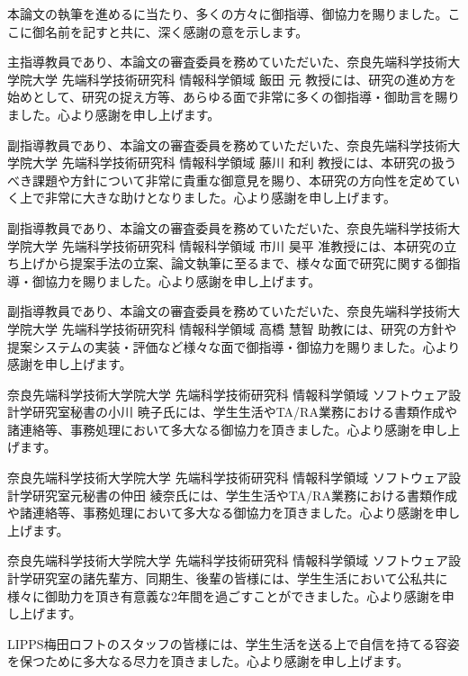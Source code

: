 本論文の執筆を進めるに当たり、多くの方々に御指導、御協力を賜りました。ここに御名前を記すと共に、深く感謝の意を示します。

主指導教員であり、本論文の審査委員を務めていただいた、奈良先端科学技術大学院大学 先端科学技術研究科 情報科学領域 飯田 元 教授には、研究の進め方を始めとして、研究の捉え方等、あらゆる面で非常に多くの御指導・御助言を賜りました。心より感謝を申し上げます。

副指導教員であり、本論文の審査委員を務めていただいた、奈良先端科学技術大学院大学 先端科学技術研究科 情報科学領域 藤川 和利 教授には、本研究の扱うべき課題や方針について非常に貴重な御意見を賜り、本研究の方向性を定めていく上で非常に大きな助けとなりました。心より感謝を申し上げます。

副指導教員であり、本論文の審査委員を務めていただいた、奈良先端科学技術大学院大学 先端科学技術研究科 情報科学領域 市川 昊平 准教授には、本研究の立ち上げから提案手法の立案、論文執筆に至るまで、様々な面で研究に関する御指導・御協力を賜りました。心より感謝を申し上げます。

副指導教員であり、本論文の審査委員を務めていただいた、奈良先端科学技術大学院大学 先端科学技術研究科 情報科学領域 高橋 慧智 助教には、研究の方針や提案システムの実装・評価など様々な面で御指導・御協力を賜りました。心より感謝を申し上げます。

奈良先端科学技術大学院大学 先端科学技術研究科 情報科学領域 ソフトウェア設計学研究室秘書の小川 暁子氏には、学生生活やTA/RA業務における書類作成や諸連絡等、事務処理において多大なる御協力を頂きました。心より感謝を申し上げます。

奈良先端科学技術大学院大学 先端科学技術研究科 情報科学領域 ソフトウェア設計学研究室元秘書の仲田 綾奈氏には、学生生活やTA/RA業務における書類作成や諸連絡等、事務処理において多大なる御協力を頂きました。心より感謝を申し上げます。

奈良先端科学技術大学院大学 先端科学技術研究科 情報科学領域 ソフトウェア設計学研究室の諸先輩方、同期生、後輩の皆様には、学生生活において公私共に様々に御助力を頂き有意義な2年間を過ごすことができました。心より感謝を申し上げます。

LIPPS梅田ロフトのスタッフの皆様には、学生生活を送る上で自信を持てる容姿を保つために多大なる尽力を頂きました。心より感謝を申し上げます。
